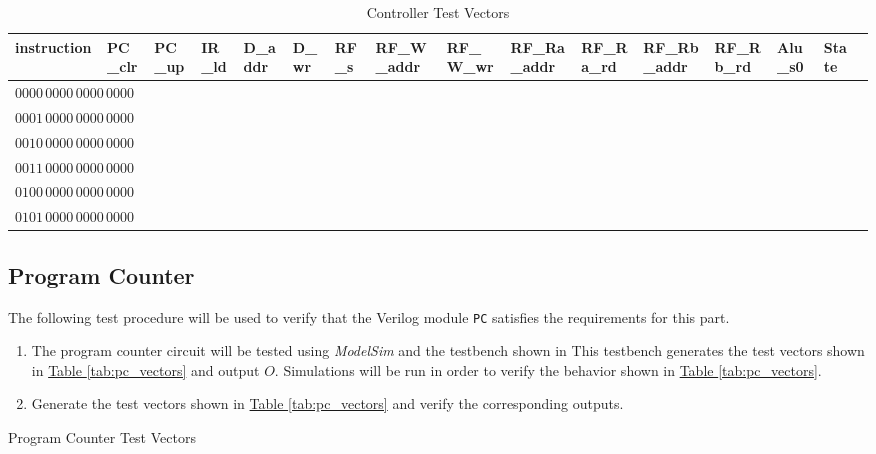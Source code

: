 \begin{sidewaystable}[htbp]
    \centering\scriptsize
        \begin{tabular}{llllllllllllllll} \toprule
            instruction              & PC\_clr   & PC\_up    & IR\_ld    & D\_addr   & D\_wr & RF\_s & RF\_W\_addr  & RF\_W\_wr    & RF\_Ra\_addr & RF\_Ra\_rd   & RF\_Rb\_addr & RF\_Rb\_rd   & Alu\_s0     & State \\\midrule
            $0000\,0000\,0000\,0000$ &   \\
            $0001\,0000\,0000\,0000$ &   \\
            $0010\,0000\,0000\,0000$ &   \\
            $0011\,0000\,0000\,0000$ &   \\
            $0100\,0000\,0000\,0000$ &   \\
            $0101\,0000\,0000\,0000$ &   \\
        \end{tabular}
    \caption{Controller Test Vectors\label{tab:controller_vectors}}
\end{sidewaystable}

\subsection{Program Counter} %
\label{sub:program_counter}

The following test procedure will be used to verify that the Verilog module \verb|PC| satisfies the requirements for this part.

\begin{enumerate}
    \item The program counter circuit will be tested using \emph{ModelSim} and the testbench shown in %
    This testbench generates the test vectors shown in \hyperref[tab:pc_vectors]{Table \ref*{tab:pc_vectors}} and output $O$.
    Simulations will be run in order to verify the behavior shown in \hyperref[tab:pc_vectors]{Table \ref*{tab:pc_vectors}}.
    \item Generate the test vectors shown in \hyperref[tab:pc_vectors]{Table \ref*{tab:pc_vectors}} and verify the corresponding outputs.
\end{enumerate}

\begin{table}[htbp]
    \centering
    \caption{Program Counter Test Vectors\label{tab:pc_vectors}}
\end{table}

